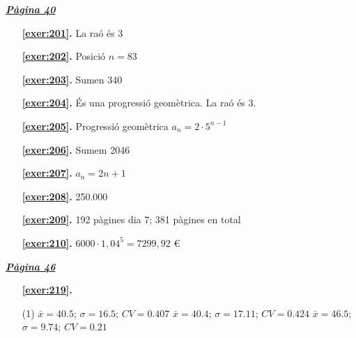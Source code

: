 \hyperlink{page.40}{\textbf{\em Pàgina 40}}
\begin{enumerate}
\item[\fontfamily{phv}\selectfont\color{blue}\textbf{\ref{exer:201}. }] \label{ans:201} 
La raó és 3
 \end{enumerate}
\begin{enumerate}
\item[\fontfamily{phv}\selectfont\color{blue}\textbf{\ref{exer:202}. }] \label{ans:202} 
Posició $n=83$
\item[\fontfamily{phv}\selectfont\color{blue}\textbf{\ref{exer:203}. }] \label{ans:203} 
Sumen 340
\item[\fontfamily{phv}\selectfont\color{blue}\textbf{\ref{exer:204}. }] \label{ans:204} 
És una progressió geomètrica. La raó és 3.
\item[\fontfamily{phv}\selectfont\color{blue}\textbf{\ref{exer:205}. }] \label{ans:205} 
Progressió geomètrica $a_{n} = 2 \cdot 5^{n-1}$ 
\item[\fontfamily{phv}\selectfont\color{blue}\textbf{\ref{exer:206}. }] \label{ans:206} 
Sumem 2046
\item[\fontfamily{phv}\selectfont\color{blue}\textbf{\ref{exer:207}. }] \label{ans:207} 
 $a_{ n} = 2n + 1$ 
\item[\fontfamily{phv}\selectfont\color{blue}\textbf{\ref{exer:208}. }] \label{ans:208} 
250.000
\item[\fontfamily{phv}\selectfont\color{blue}\textbf{\ref{exer:209}. }] \label{ans:209} 
192 pàgines dia 7; 381 pàgines en total
\item[\fontfamily{phv}\selectfont\color{blue}\textbf{\ref{exer:210}. }] \label{ans:210} 
$6000\cdot 1,04^5 = 7299,92$ \euro {}
 \end{enumerate}

 \vspace{1cm} 
 

\vspace{0.3cm}


\hyperlink{page.46}{\textbf{\em Pàgina 46}}
\begin{enumerate}



 \item[\fontfamily{phv}\selectfont\color{blue}\textbf{\ref{exer:219}. }] \label{ans:219}
 \begin{tasks}[column-sep=1em, item-indent=1.3333em](1)
	 \task* $\bar x=40.5$; $\sigma =16.5$; $CV=0.407$
	 \task* $\bar x=40.4$; $\sigma =17.11$; $CV=0.424$
	 \task* $\bar x=46.5$; $\sigma =9.74$; $CV=0.21$ \par {}
\end{tasks}
 \end{enumerate}
\vspace{0.3cm}

